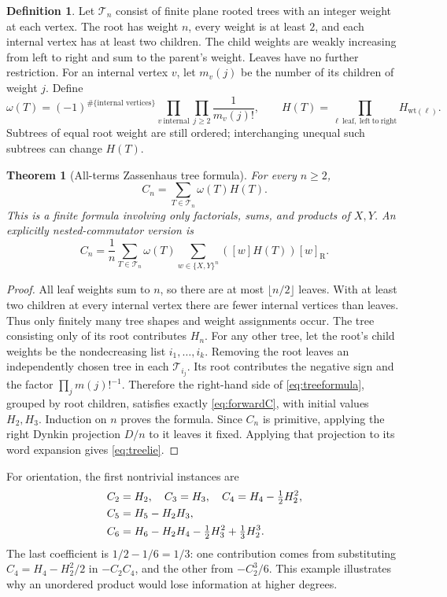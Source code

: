 \documentclass[11pt]{article}
\numberwithin{equation}{section}
\newtheorem{theorem}{Theorem}[section]
\theoremstyle{definition}
\newtheorem{definition}[definition]{Definition}
\theoremstyle{remark}
\newcommand{\cT}{\mathcal{T}}
\newcommand{\RB}[1]{[#1]_{\mathrm R}}
\begin{document}
\begin{definition}
Let $\cT_n$ consist of finite plane rooted trees with an integer
weight at each vertex. The root has weight $n$, every weight is at
least $2$, and each internal vertex has at least two children.
The child weights are weakly increasing from left to right and sum
to the parent's weight. Leaves have no further restriction.
For an internal vertex $v$, let $m_v(j)$ be the number of its
children of weight $j$. Define
\begin{equation}\label{eq:treeweight}
 \omega(T)=(-1)^{\#\{\text{internal vertices}\}}
           \prod_{v\ \mathrm{internal}}\prod_{j\geq2}\frac1{m_v(j)!},
 \qquad
 H(T)=\prod_{\ell\ \mathrm{leaf,\ left\ to\ right}}H_{\mathrm{wt}(\ell)}.
\end{equation}
Subtrees of equal root weight are still ordered; interchanging
unequal such subtrees can change $H(T)$.
\end{definition}

\begin{theorem}[All-terms Zassenhaus tree formula]\label{thm:trees}
For every $n\geq2$,
\begin{equation}\label{eq:treeformula}
 \boxed{\displaystyle C_n=\sum_{T\in\cT_n}\omega(T)H(T).}
\end{equation}
This is a finite formula involving only factorials, sums, and
products of $X,Y$. An explicitly nested-commutator version is
\begin{equation}\label{eq:treelie}
 C_n=\frac1n\sum_{T\in\cT_n}\omega(T)
       \sum_{w\in\{X,Y\}^n}([w]H(T))\RB{w}.
\end{equation}
\end{theorem}
\begin{proof}
All leaf weights sum to $n$, so there are at most $\lfloor n/2\rfloor$
leaves. With at least two children at every internal vertex there
are fewer internal vertices than leaves. Thus only finitely many
tree shapes and weight assignments occur.
The tree consisting only of its root contributes $H_n$. For any
other tree, let the root's child weights be the nondecreasing list
$i_1,\ldots,i_k$. Removing the root leaves an independently chosen
tree in each $\cT_{i_j}$. Its root contributes the negative sign
and the factor $\prod_jm(j)!^{-1}$. Therefore the right-hand side
of \eqref{eq:treeformula}, grouped by root children, satisfies
exactly \eqref{eq:forwardC}, with initial values $H_2,H_3$.
Induction on $n$ proves the formula. Since $C_n$ is primitive,
applying the right Dynkin projection $D/n$ to it leaves it fixed.
Applying that projection to its word expansion gives
\eqref{eq:treelie}.
\end{proof}
For orientation, the first nontrivial instances are
\begin{align}
 C_2&=H_2,\quad C_3=H_3,\quad C_4=H_4-\tfrac12H_2^2,\notag\\
 C_5&=H_5-H_2H_3,\notag\\
 C_6&=H_6-H_2H_4-\tfrac12H_3^2+\tfrac13H_2^3.
 \label{eq:CinH}
\end{align}
The last coefficient is $1/2-1/6=1/3$: one contribution comes
from substituting $C_4=H_4-H_2^2/2$ in $-C_2C_4$, and the other
from $-C_2^3/6$. This example illustrates why an unordered product
would lose information at higher degrees.
\end{document}

